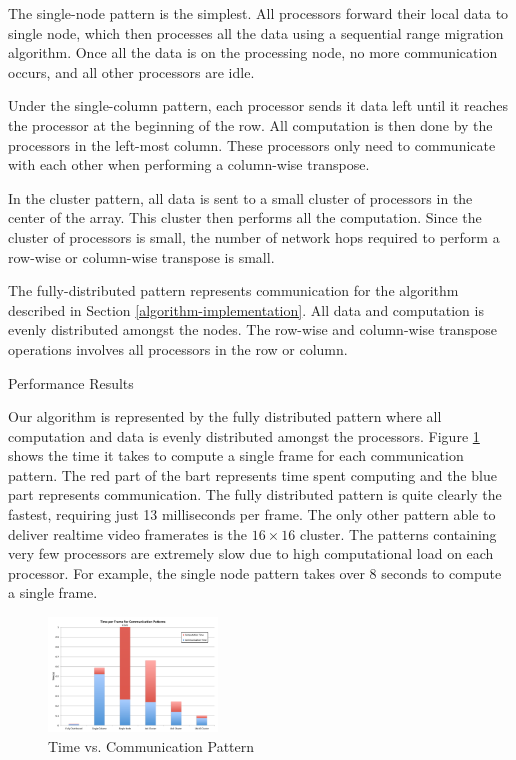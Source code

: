 \documentclass[twocolumn]{article}
\makeatletter
\def\section{\@startsection{section}{1}{\z@}{24pt plus 2 pt
minus 2 pt} {12pt plus 2pt minus 2pt}{\large\bf}}
\makeatother
\begin{document}
The single-node pattern is the simplest. All processors forward their local data to single node, which then processes all the data using a sequential range migration algorithm. Once all the data is on the processing node, no more communication occurs, and all other processors are idle. 

Under the single-column pattern, each processor sends it data left until it reaches the processor at the beginning of the row. All computation is then done by the processors in the left-most column. These processors only need to communicate with each other when performing a column-wise transpose.

In the cluster pattern, all data is sent to a small cluster of processors in the center of the array. This cluster then performs all the computation. Since the cluster of processors is small, the number of network hops required to perform a row-wise or column-wise transpose is small.

The fully-distributed pattern represents communication for the algorithm described in Section \ref{algorithm-implementation}. All data and computation is evenly distributed amongst the nodes. The row-wise and column-wise transpose operations involves all processors in the row or column.

\section{Performance Results}

Our algorithm is represented by the fully distributed pattern where all computation and data is evenly distributed amongst the processors. Figure \ref{time vs comm pattern} shows the time it takes to compute a single frame for each communication pattern. The red part of the bart represents time spent computing and the blue part represents communication. The fully distributed pattern is quite clearly the fastest, requiring just 13 milliseconds per frame. The only other pattern able to deliver realtime video framerates is the $16\times16$ cluster. The patterns containing very few processors are extremely slow due to high computational load on each processor. For example, the single node pattern takes over 8 seconds to compute a single frame.

\begin{figure}[!h]
\centering
\includegraphics*[width=0.4\textwidth]{figures/chart5.pdf}
\caption{Time vs. Communication Pattern}
\label{time vs comm pattern}
\end{figure}
\end{document}
